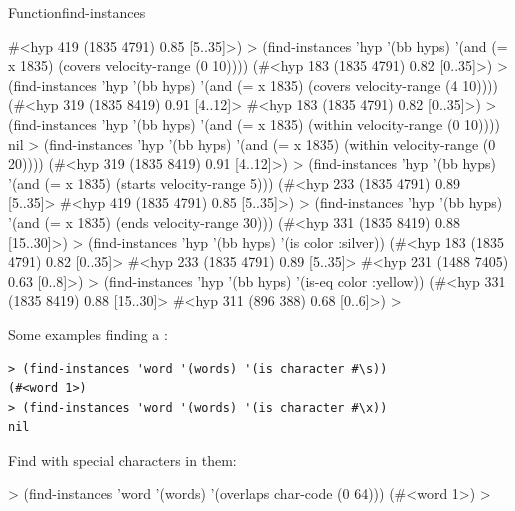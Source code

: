 \documentclass[10pt,twoside,english,pdftex]{article}
\begin{document}
\begin{functiondoc}{Function}{find-instances}
\begin{example}
   #<hyp 419 (1835 4791) 0.85 [5..35]>)\goodpagebreak
  > (find-instances 'hyp '(bb hyps) 
      '(and (= x 1835) (covers velocity-range (0 10))))
  (#<hyp 183 (1835 4791) 0.82 [0..35]>)
  > (find-instances 'hyp '(bb hyps) 
      '(and (= x 1835) (covers velocity-range (4 10))))
  (#<hyp 319 (1835 8419) 0.91 [4..12]>
   #<hyp 183 (1835 4791) 0.82 [0..35]>)\goodpagebreak
  > (find-instances 'hyp '(bb hyps) 
      '(and (= x 1835) (within velocity-range (0 10))))
  nil
  > (find-instances 'hyp '(bb hyps) 
      '(and (= x 1835) (within velocity-range (0 20))))
  (#<hyp 319 (1835 8419) 0.91 [4..12]>)\goodpagebreak
  > (find-instances 'hyp '(bb hyps) 
      '(and (= x 1835) (starts velocity-range 5)))
  (#<hyp 233 (1835 4791) 0.89 [5..35]>
   #<hyp 419 (1835 4791) 0.85 [5..35]>)\goodpagebreak
  > (find-instances 'hyp '(bb hyps) 
      '(and (= x 1835) (ends velocity-range 30)))
  (#<hyp 331 (1835 8419) 0.88 [15..30]>)
  > (find-instances 'hyp '(bb hyps) 
      '(is color :silver))
  (#<hyp 183 (1835 4791) 0.82 [0..35]> 
   #<hyp 233 (1835 4791) 0.89 [5..35]>
   #<hyp 231 (1488 7405) 0.63 [0..8]>)
  > (find-instances 'hyp '(bb hyps) 
      '(is-eq color :yellow))
  (#<hyp 331 (1835 8419) 0.88 [15..30]> 
   #<hyp 311 (896 388) 0.68 [0..6]>)
  >
\end{example}

Some examples finding a  :
%
\W\supp
\begin{verbatim}
> (find-instances 'word '(words) '(is character #\s))
(#<word 1>)
> (find-instances 'word '(words) '(is character #\x))
nil
\end{verbatim}
%
Find   with special characters in them:
%
\W\supp\notpretop
\begin{example}
  > (find-instances 'word '(words) '(overlaps char-code (0 64)))
  (#<word 1>)
  >
\end{example}

\end{functiondoc}

\end{document}
